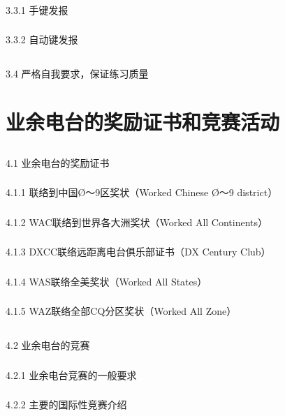 \documentclass[12pt,UTF8]{ctexbook}
\begin{document}
\subsection{}3.3.1 手键发报
\subsection{}3.3.2 自动键发报
\section{}3.4 严格自我要求，保证练习质量

\chapter{业余电台的奖励证书和竞赛活动}

\section{}4.1 业余电台的奖励证书
\subsection{}4.1.1 联络到中国Ø～9区奖状（Worked Chinese Ø～9 district）
\subsection{}4.1.2 WAC联络到世界各大洲奖状（Worked All Continents）
\subsection{}4.1.3 DXCC联络远距离电台俱乐部证书（DX Century Club）
\subsection{}4.1.4 WAS联络全美奖状（Worked All States）
\subsection{}4.1.5 WAZ联络全部CQ分区奖状（Worked All Zone）
\section{}4.2 业余电台的竞赛
\subsection{}4.2.1 业余电台竞赛的一般要求
\subsection{}4.2.2 主要的国际性竞赛介绍
\end{document}
